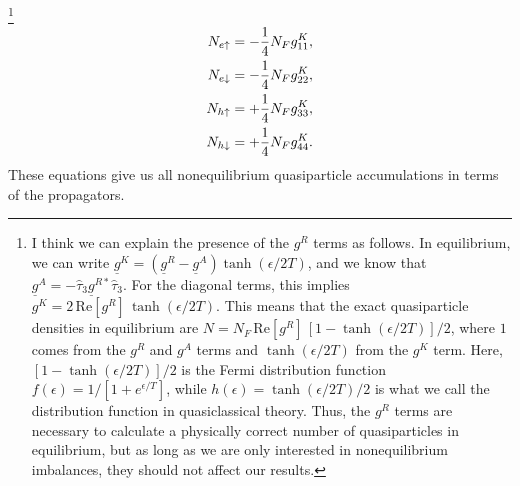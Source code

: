 \footnote{I think we can explain the presence of the $g^R$ terms as follows.
  In equilibrium, we can write $\underline{g}^K = (\underline{g}^R - \underline{g}^A) \tanh(\epsilon/2T)$, and we know that $\underline{g}^A = -\hat{\tau}_3 \underline{g}^{R\ast} \hat{\tau}_3$.
  For the diagonal terms, this implies $g^K = 2\,\text{Re}[g^R]\,\tanh(\epsilon/2T)$. 
  This means that the exact quasiparticle densities in equilibrium are $N = N_F\,\text{Re}[g^R]\,[1-\tanh(\epsilon/2T)]/2$, where $1$ comes from the $g^R$ and $g^A$ terms and $\tanh(\epsilon/2T)$ from the $g^K$ term.
  Here, $[1-\tanh(\epsilon/2T)]/2$ is the Fermi distribution function $f(\epsilon)=1/[1+e^{\epsilon/T}]$, while $h(\epsilon)=\tanh(\epsilon/2T)/2$ is what we call the distribution function in quasiclassical theory.
  Thus, the $g^R$ terms are necessary to calculate a physically correct number of quasiparticles in equilibrium, but as long as we are only interested in nonequilibrium imbalances, they should not affect our results.}%
\begin{align}
  N_{e\uparrow} &= -\frac{1}{4}N_F g^K_{11}, \\
  N_{e\downarrow} &= -\frac{1}{4}N_F g^K_{22}, \\
  N_{h\uparrow} &= +\frac{1}{4}N_F g^K_{33}, \\
  N_{h\downarrow} &= +\frac{1}{4}N_F g^K_{44}.
\end{align}
These equations give us all nonequilibrium quasiparticle accumulations in terms of the propagators.

